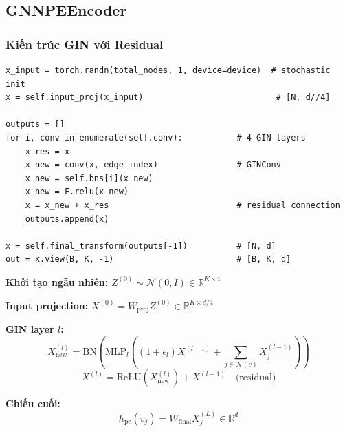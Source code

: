 \documentclass[12pt,a4paper]{article}
\begin{document}
\subsection{GNNPEEncoder}

\subsubsection{Kiến trúc GIN với Residual}

\begin{codebox}[title={encoders.py -- GNNPEEncoder.forward() (rút gọn)}]
\begin{lstlisting}
x_input = torch.randn(total_nodes, 1, device=device)  # stochastic init
x = self.input_proj(x_input)                           # [N, d//4]

outputs = []
for i, conv in enumerate(self.conv):           # 4 GIN layers
    x_res = x
    x_new = conv(x, edge_index)                # GINConv
    x_new = self.bns[i](x_new)
    x_new = F.relu(x_new)
    x = x_new + x_res                          # residual connection
    outputs.append(x)

x = self.final_transform(outputs[-1])          # [N, d]
out = x.view(B, K, -1)                         # [B, K, d]
\end{lstlisting}
\end{codebox}

\begin{mathbox}[title={Công thức GIN với Residual}]
\textbf{Khởi tạo ngẫu nhiên:} $Z^{(0)} \sim \mathcal{N}(0, I) \in \mathbb{R}^{K \times 1}$

\textbf{Input projection:} $X^{(0)} = W_\text{proj} Z^{(0)} \in \mathbb{R}^{K \times d/4}$

\textbf{GIN layer $l$:}
\begin{equation}
  X^{(l)}_\text{new} = \text{BN}\!\left(
    \text{MLP}_l\!\left(
      (1 + \epsilon_l) X^{(l-1)} + \sum_{j \in \mathcal{N}(v)} X^{(l-1)}_j
    \right)
  \right)
\end{equation}
\begin{equation}
  X^{(l)} = \text{ReLU}(X^{(l)}_\text{new}) + X^{(l-1)}
  \quad \text{(residual)}
  \label{eq:gin_res}
\end{equation}

\textbf{Chiếu cuối:}
\begin{equation}
  h_\text{pe}(v_j) = W_\text{final} X^{(L)}_j \in \mathbb{R}^d
\end{equation}
\end{mathbox}
\end{document}
